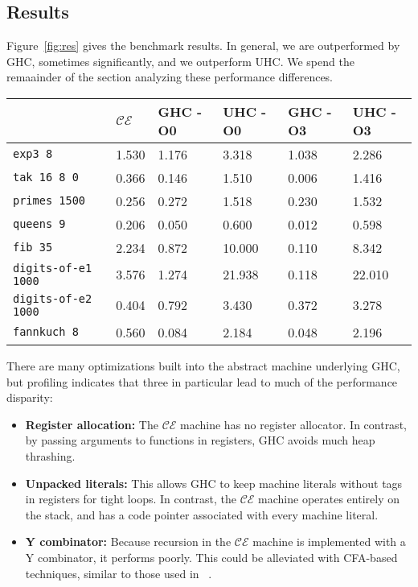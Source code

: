 \subsection{Results} \label{sec:res}

Figure~\ref{fig:res} gives the benchmark results.  In general, we are
outperformed by GHC, sometimes significantly, and we outperform UHC. We
spend the remaainder of the section analyzing these performance differences.

\begin{figure*}
\centering
\begin{tabularx}{\textwidth}{l | X | X | X | X | X}
& $\mathcal{CE}$ & GHC -O0 & UHC -O0 & GHC -O3 & UHC -O3 \\
\hline
\texttt{exp3 8} & 1.530 & 1.176 & 3.318 & 1.038 & 2.286 \\
\texttt{tak 16 8 0} & 0.366 & 0.146 & 1.510 & 0.006 & 1.416 \\
\texttt{primes 1500} & 0.256 & 0.272 & 1.518 & 0.230 & 1.532 \\
\texttt{queens 9} & 0.206 & 0.050 & 0.600 & 0.012 & 0.598 \\
\texttt{fib 35} & 2.234 & 0.872 & 10.000 & 0.110 & 8.342 \\
\texttt{digits-of-e1 1000} & 3.576 & 1.274 & 21.938 & 0.118 & 22.010 \\
\texttt{digits-of-e2 1000} & 0.404 & 0.792 & 3.430 & 0.372 & 3.278 \\
\texttt{fannkuch 8} & 0.560 & 0.084 & 2.184 & 0.048 & 2.196 \\
\end{tabularx}
\caption{Machine Literals Benchmark Results. Measurement is wall clock time,
units are seconds. Times averaged over 5 runs.}
\label{fig:res}
\end{figure*}

There are many optimizations built into the abstract machine underlying GHC,
but profiling indicates that three in particular lead to much of the performance
disparity: 

\begin{itemize}
\item \textbf{Register allocation:} The $\mathcal{CE}$ machine has no register
allocator. In contrast, by passing arguments to functions in registers, GHC
avoids much heap thrashing.
\item \textbf{Unpacked literals:} This allows GHC to keep machine literals
without tags in registers for tight loops. In contrast, the $\mathcal{CE}$
machine operates entirely on the stack, and has a code pointer associated with
every machine literal. 
\item \textbf{Y combinator:} Because recursion in the $\mathcal{CE}$ machine is
implemented with a Y combinator, it performs poorly. This could be alleviated
with CFA-based techniques, similar to those used in ~\cite{rozas1992taming}. 
\end{itemize}

